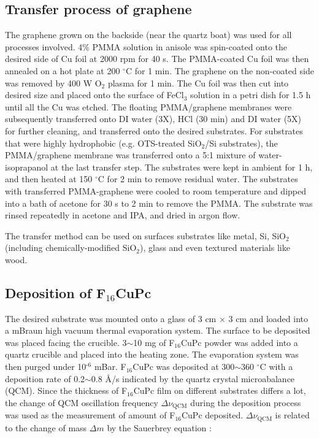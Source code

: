 \subsection{Transfer process of graphene}
\label{sec:small-gr-transfer}
The graphene grown on the backside (near the quartz boat) was used for
all processes involved. 4\% PMMA solution in anisole was spin-coated
onto the desired side of Cu foil at 2000 rpm for 40 s. The PMMA-coated
Cu foil was then annealed on a hot plate at 200 \(^{\circ}\mathrm{C}\)
for 1 min. The graphene on the non-coated side was removed by 400 W
O\(_{\text{2}}\) plasma for 1 min. The Cu foil was then cut into desired size and
placed onto the surface of FeCl\(_{\text{3}}\) solution in a petri dish for 1.5 h
until all the Cu was etched. The floating PMMA/graphene membranes were
subsequently transferred onto DI water (3X), HCl (30 min) and DI water
(5X) for further cleaning, and transferred onto the desired
substrates. For substrates that were highly hydrophobic
(e.g. OTS-treated SiO\(_{\text{2}}\)/Si substrates), the PMMA/graphene membrane
was transferred onto a 5:1 mixture of water-isoprapanol at the last
transfer step. The substrates were kept in ambient for 1 h, and then heated at 150 \(^{\circ}\mathrm{C}\) for
2 min to remove residual water. The substrates with transferred
PMMA-graphene were cooled to room temperature and dipped into a bath of
acetone for 30 s to 2 min to remove the PMMA. The substrate was rinsed
repeatedly in acetone and IPA, and dried in argon flow.

The transfer method can be used on surfaces substrates like metal, Si,
SiO\(_{\text{2}}\) (including chemically-modified SiO\(_{\text{2}}\)), glass and even
textured materials like wood. 

\subsection{Deposition of F\(_{\text{16}}\)CuPc}
\label{sec:small-org80e1aed}

The desired substrate was mounted onto a glass of 3 cm \(\times\) 3 cm
and loaded into a mBraun high vacuum thermal evaporation system. The
surface to be deposited was placed facing the crucible. 3\(\sim\)10 mg
of F\(_{\text{16}}\)CuPc powder was added into a quartz crucible and placed into
the heating zone. The evaporation system was then purged under 10\(^{\text{-6}}\)
mBar. F\(_{\text{16}}\)CuPc was deposited at 300\(\sim\)360 \(^{\circ}\mathrm{C}\)
with a deposition rate of 0.2\(\sim\)0.8 \AA{}/s indicated by the quartz
crystal microabalance (QCM). Since the thickness of F\(_{\text{16}}\)CuPc film on
different substrates differs a lot, the change of QCM oscillation
frequency \(\Delta \nu_{\mathrm{QCM}}\) during the deposition process
was used as the measurement of amount of F\(_{\text{16}}\)CuPc deposited. \(\Delta
\nu_{\mathrm{QCM}}\) is related to the change of mass \(\Delta m\) by the
Sauerbrey equation \cite{Sauerbrey_1959}:


